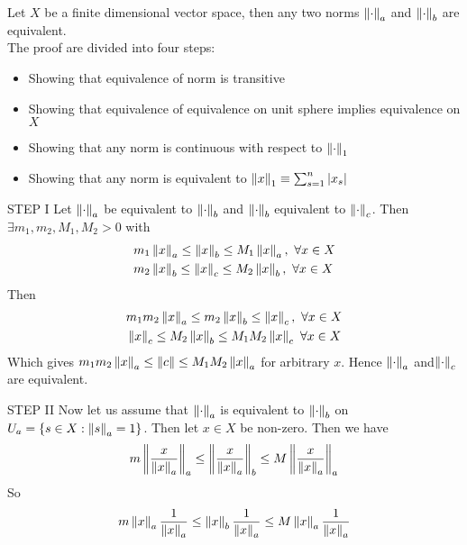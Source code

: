 \documentclass{article}
\begin{document}
\begin{theorem}\rm\nextline
	Let $X$ be a finite dimensional vector space, then any two norms $\left\|{\cdot}\right\|_a$ and $\left\|{\cdot}\right\|_b$ are equivalent.\\
	\prf The proof are divided into four steps:
	\begin{itemize}
		\item Showing that equivalence of norm is transitive
		\item Showing that equivalence of equivalence on unit sphere implies equivalence on $X$
		\item Showing that any norm is continuous with respect to $\left\|{\cdot}\right\|_1$
		\item Showing that any norm is equivalent to $\left\|{x}\right\|_1\equiv\sum_{s=1}^n |x_s|$
	\end{itemize}
	\begin{pf}{STEP I}{}
		Let $\left\|{\cdot}\right\|_a$ be equivalent to $\left\|{\cdot}\right\|_b$ and $\left\|{\cdot}\right\|_b$ equivalent to $\left\|{\cdot}\right\|_c$.
		Then $\exists m_1,m_2,M_1,M_2>0$ with
		\begin{equation}
			\begin{split}\nonumber
				&m_1\left\|{x}\right\|_a\leq \left\|{x}\right\|_b\leq M_1\left\|{x}\right\|_a,\,\,\forall x\in X\\
				&m_2\left\|{x}\right\|_b\leq \left\|{x}\right\|_c\leq M_2\left\|{x}\right\|_b,\,\,\forall x\in X
			\end{split}
		\end{equation}
		Then
		\begin{equation}
			\begin{split}\nonumber
				&m_1m_2\left\|{x}\right\|_a\leq m_2\left\|{x}\right\|_b\leq \left\|{x}\right\|_c,\,\,\forall x\in X\\
				&\left\|{x}\right\|_c\leq M_2\left\|{x}\right\|_b\leq M_1M_2\left\|{x}\right\|_c\,\,\forall x\in X
			\end{split}
		\end{equation}
		Which gives $m_1m_2\left\|{x}\right\|_a\leq\left\|{c}\right\|\leq M_1M_2\left\|{x}\right\|_a$ for arbitrary $x$. Hence $\left\|{\cdot}\right\|_a$ and$\left\|{\cdot}\right\|_c$ are equivalent.
	\end{pf}
	\begin{pf}{STEP II}{}
		Now let us assume that $\left\|{\cdot}\right\|_a$ is equivalent to $\left\|{\cdot}\right\|_b$ on $U_a=\{s\in X:\left\|{s}\right\|_a=1\}$.
		Then let $x\in X$ be non-zero. Then we have
		$$
			m\left\|{\frac{x}{\left\|{x}\right\|_a}}\right\|_a\leq \left\|{\frac{x}{\left\|{x}\right\|_a}}\right\|_b\leq M\left\|{\frac{x}{\left\|{x}\right\|_a}}\right\|_a
		$$
		So
		$$
			m\left\|{x}\right\|_a\frac{1}{\left\|{x}\right\|_a}\leq \left\|{x}\right\|_b\frac{1}{\left\|{x}\right\|_a}\leq M\left\|{x}\right\|_a\frac{1}{\left\|{x}\right\|_a}
$$
\end{pf}
\end{theorem}
\end{document}
